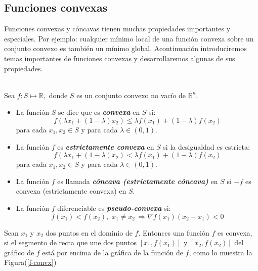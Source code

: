 \subsection{Funciones convexas}%

Funciones convexas y c\'oncavas tienen muchas propiedades importantes y especiales. Por ejemplo: cualquier m\'inimo local de una funci\'on
convexa sobre un conjunto convexo es tambi\'en un m\'inimo global. Acontinuaci\'on introduciremos temas importantes de funciones convexas 
y desarrollaremos algunas de sus propiedades.\\ \\

{ Sea $f: S \longmapsto \mathbb{R}, $ donde $S$ es un conjunto convexo no vac\'io de $\mathbb{R}^n$.
\begin{itemize}
   \item La funci\'on $S$ se dice que es \textbf{\itshape convexa} en $S$ si:
	 $$f(\lambda x_1 + (1 - \lambda)x_2) \leqslant \lambda f(x_1) + (1 - \lambda) f(x_2)$$
	 para cada $ x_1, x_2 \in S $ y para cada $ \lambda \in (0, 1)$.
   \item La funci\'on $f$ es \textbf{\itshape estrictamente convexa} en $S$ si la desigualdad es estricta:
	 $$f(\lambda x_1 + (1 - \lambda)x_2) < \lambda f(x_1) + (1 - \lambda) f(x_2)$$
	 para cada $ x_1, x_2 \in S $ y para cada $ \lambda \in (0, 1)$.
   \item La funci\'on $f$ es llamada \textbf{\itshape c\'oncava (estrictamente c\'oncava)} en $S$ si $-f$ es convexa (estrictamente convexa)
	 en $S$.
   \item La funci\'on $f$ diferenciable es \textbf{\itshape pseudo-convexa} si:\\
	 $$f(x_1) < f(x_2),\,\, x_1 \neq x_2 \, \Longrightarrow \nabla f(x_1)(x_2 - x_1) < 0$$
\end{itemize}
\label{f-convex} }

Sean $x_1$ y $ x_2 $ dos puntos en el dominio de $f.$ Entonces una funci\'on $f$ es convexa, si el segmento de recta que une dos 
puntos $[x_1, f(x_1)]$ y $[x_2, f(x_2)]$ del gr\'afico de $f$ est\'a por encima de la gr\'afica de la funci\'on de $f$, como lo muestra la 
Figura(\ref{f-convx})

